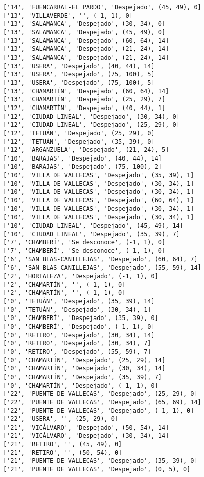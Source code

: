 \documentclass[11pt]{article}
\begin{document}
\begin{Verbatim}[commandchars=\\\{\}]
['14', 'FUENCARRAL-EL PARDO', 'Despejado', (45, 49), 0]
['13', 'VILLAVERDE', '', (-1, 1), 0]
['13', 'SALAMANCA', 'Despejado', (30, 34), 0]
['13', 'SALAMANCA', 'Despejado', (45, 49), 0]
['13', 'SALAMANCA', 'Despejado', (60, 64), 14]
['13', 'SALAMANCA', 'Despejado', (21, 24), 14]
['13', 'SALAMANCA', 'Despejado', (21, 24), 14]
['13', 'USERA', 'Despejado', (40, 44), 14]
['13', 'USERA', 'Despejado', (75, 100), 5]
['13', 'USERA', 'Despejado', (75, 100), 5]
['13', 'CHAMARTÍN', 'Despejado', (60, 64), 14]
['13', 'CHAMARTÍN', 'Despejado', (25, 29), 7]
['12', 'CHAMARTÍN', 'Despejado', (40, 44), 1]
['12', 'CIUDAD LINEAL', 'Despejado', (30, 34), 0]
['12', 'CIUDAD LINEAL', 'Despejado', (25, 29), 0]
['12', 'TETUÁN', 'Despejado', (25, 29), 0]
['12', 'TETUÁN', 'Despejado', (35, 39), 0]
['12', 'ARGANZUELA', 'Despejado', (21, 24), 5]
['10', 'BARAJAS', 'Despejado', (40, 44), 14]
['10', 'BARAJAS', 'Despejado', (75, 100), 2]
['10', 'VILLA DE VALLECAS', 'Despejado', (35, 39), 1]
['10', 'VILLA DE VALLECAS', 'Despejado', (30, 34), 1]
['10', 'VILLA DE VALLECAS', 'Despejado', (30, 34), 1]
['10', 'VILLA DE VALLECAS', 'Despejado', (60, 64), 1]
['10', 'VILLA DE VALLECAS', 'Despejado', (30, 34), 1]
['10', 'VILLA DE VALLECAS', 'Despejado', (30, 34), 1]
['10', 'CIUDAD LINEAL', 'Despejado', (45, 49), 14]
['10', 'CIUDAD LINEAL', 'Despejado', (35, 39), 7]
['7', 'CHAMBERÍ', 'Se desconoce', (-1, 1), 0]
['7', 'CHAMBERÍ', 'Se desconoce', (-1, 1), 0]
['6', 'SAN BLAS-CANILLEJAS', 'Despejado', (60, 64), 7]
['6', 'SAN BLAS-CANILLEJAS', 'Despejado', (55, 59), 14]
['2', 'HORTALEZA', 'Despejado', (-1, 1), 0]
['2', 'CHAMARTÍN', '', (-1, 1), 0]
['2', 'CHAMARTÍN', '', (-1, 1), 0]
['0', 'TETUÁN', 'Despejado', (35, 39), 14]
['0', 'TETUÁN', 'Despejado', (30, 34), 1]
['0', 'CHAMBERÍ', 'Despejado', (35, 39), 0]
['0', 'CHAMBERÍ', 'Despejado', (-1, 1), 0]
['0', 'RETIRO', 'Despejado', (30, 34), 14]
['0', 'RETIRO', 'Despejado', (30, 34), 7]
['0', 'RETIRO', 'Despejado', (55, 59), 7]
['0', 'CHAMARTÍN', 'Despejado', (25, 29), 14]
['0', 'CHAMARTÍN', 'Despejado', (30, 34), 14]
['0', 'CHAMARTÍN', 'Despejado', (35, 39), 7]
['0', 'CHAMARTÍN', 'Despejado', (-1, 1), 0]
['22', 'PUENTE DE VALLECAS', 'Despejado', (25, 29), 0]
['22', 'PUENTE DE VALLECAS', 'Despejado', (65, 69), 14]
['22', 'PUENTE DE VALLECAS', 'Despejado', (-1, 1), 0]
['22', 'USERA', '', (25, 29), 0]
['21', 'VICÁLVARO', 'Despejado', (50, 54), 14]
['21', 'VICÁLVARO', 'Despejado', (30, 34), 14]
['21', 'RETIRO', '', (45, 49), 0]
['21', 'RETIRO', '', (50, 54), 0]
['21', 'PUENTE DE VALLECAS', 'Despejado', (35, 39), 0]
['21', 'PUENTE DE VALLECAS', 'Despejado', (0, 5), 0]

\end{Verbatim}
\end{document}
